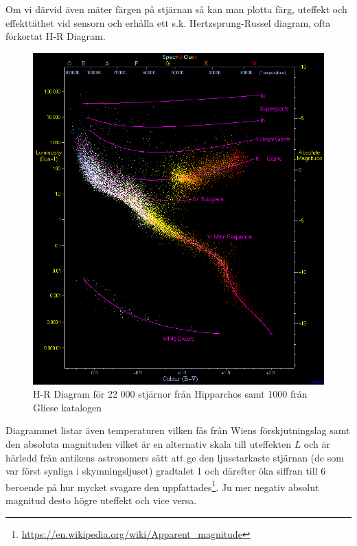 \documentclass[./exercises.tex]{subfiles}
\begin{document}
Om vi därvid även mäter färgen på stjärnan så kan man plotta färg, uteffekt och effekttäthet vid sensorn
och erhålla ett s.k. Hertzsprung-Russel diagram, ofta förkortat H-R Diagram.
\begin{figure}[H]
\begin{center}
  \includegraphics[scale=0.5]{HRDiagram.png}
  \caption{H-R Diagram för 22 000 stjärnor från Hipparchos samt 1000 från Gliese katalogen }
  \end{center}
  \label{fig4}
\end{figure}
Diagrammet listar även temperaturen vilken fås från Wiens förskjutningslag samt den absoluta magnituden vilket
är en alternativ skala till uteffekten $L$ och är härledd från antikens astronomers sätt att ge den ljusstarkaste
stjärnan (de som var först synliga i skymningsljuset) gradtalet 1 och därefter öka siffran till 6 beroende
på hur mycket svagare den uppfattades\footnote{\url{https://en.wikipedia.org/wiki/Apparent_magnitude}}.
Ju mer negativ absolut magnitud desto högre uteffekt och vice versa.
\end{document}
